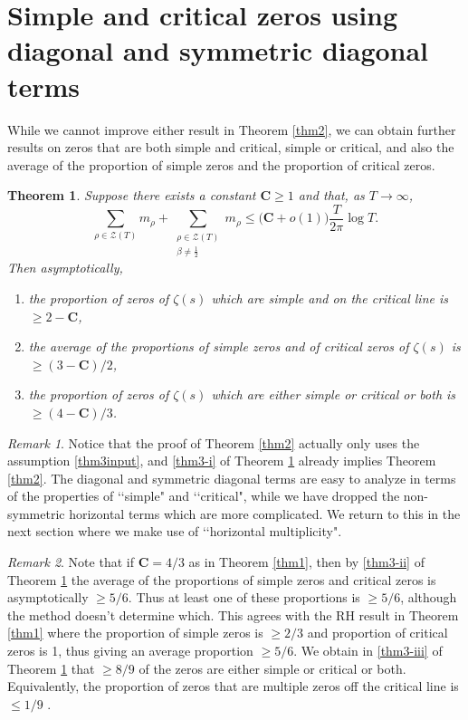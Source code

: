 \documentclass[11pt]{amsart}
\newtheorem{theorem}{Theorem}%
\theoremstyle{remark}
\newtheorem{remark}{Remark}
\theoremstyle{plain}
\numberwithin{equation}{section}
\begin{document}
\section{Simple and critical zeros using diagonal and symmetric diagonal terms}

While we cannot improve either result in Theorem \ref{thm2}, we can obtain further results on zeros that are both simple and critical, simple or critical, and also the average of the proportion of simple zeros and the proportion of critical zeros.

\begin{theorem} \label{thm3} Suppose there exists a constant $ \mathbf{C}\ge 1$ and that, as $T\to \infty$, 
\begin{equation} \label{thm3input}
\sum_{\rho \in \mathcal{Z}(T)} m_{\rho} + \sum_{\substack{\rho \in \mathcal{Z}(T) \\ \beta \neq \frac{1}{2}}} m_{\rho}
\le \Big(\mathbf{C}+o(1)\Big) \frac{T}{2\pi}\log{T}. \end{equation}
Then asymptotically,
\begin{enumerate}[label={(\roman*)},itemsep=4pt]
\item \label{thm3-i} the proportion of zeros of $\zeta(s)$ which are simple and on the critical line is $\ge 2-\mathbf{C}$,
\item \label{thm3-ii} the average of the proportions of simple zeros and of critical zeros of $\zeta(s)$ is $\ge (3-\mathbf{C})/2$,
\item \label{thm3-iii} the proportion of zeros of $\zeta(s)$ which are either simple or critical or both is $\ge (4-\mathbf{C})/3$.
\end{enumerate}
\end{theorem}

\begin{remark} Notice that the proof of Theorem \ref{thm2} actually only uses the assumption \eqref{thm3input}, and \ref{thm3-i} of Theorem \ref{thm3} already implies Theorem \ref{thm2}. The diagonal and symmetric diagonal terms are easy to analyze in terms of the properties of \lq \lq simple" and \lq \lq critical", while we have dropped the non-symmetric horizontal terms which are more complicated. We return to this in the next section where we make use of \lq \lq horizontal multiplicity".
\end{remark}

\begin{remark} Note that if $\mathbf{C}=4/3$ as in Theorem \ref{thm1}, then by \ref{thm3-ii} of Theorem \ref{thm3} the average of the proportions of simple zeros and critical zeros is asymptotically $\ge 5/6$. Thus at least one of these proportions is $\ge 5/6$, although the method doesn't determine which. This agrees with the RH result in Theorem \ref{thm1} where the proportion of simple zeros is $\ge 2/3$ and proportion of critical zeros is 1, thus giving an average proportion $\ge 5/6$. We obtain in \ref{thm3-iii} of Theorem \ref{thm3} that $\ge 8/9$ of the zeros are either simple or critical or both. Equivalently, the proportion of zeros that are multiple zeros off the critical line is $\le 1/9$ . 
\end{remark}
\end{document}
